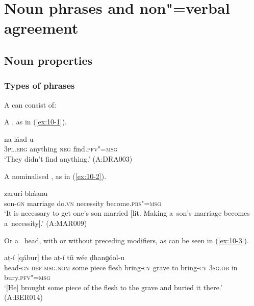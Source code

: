 \chapter{Noun phrases and non"=verbal agreement}
\label{chap:10}


\section{Noun  properties}
\label{sec:10-1}

\subsection{Types of  phrases}
\label{subsec:10-1-1}


A   can consist of: 


A , as in (\ref{ex:10-1}).

\begin{exe}
\ex
\label{ex:10-1}
\gll [taním] [ɡa] na láad-u  \\
\textsc{3pl.erg} anything \textsc{neg} find.\textsc{pfv"=msg} \\
\glt `They didn't find anything.' (A:DRA003)
\end{exe}

A nominalised , as in (\ref{ex:10-2}).

\begin{exe}
\ex
\label{ex:10-2}
 zarurí bháanu \\
son-\textsc{gn} marriage do.\textsc{vn} necessity become.\textsc{prs"=msg}  \\
\glt `It is necessary to get one's son married [lit. Making a~son's marriage becomes a~necessity].' (A:MAR009)
\end{exe}

Or a~ head, with or without preceding modifiers, as can be seen in (\ref{ex:10-3}).

\begin{exe}
\ex
\label{ex:10-3}
 aṭ-í [qábur] the aṭ-í tíi wée ḍhanɡóol-u \\
head-\textsc{gn} \textsc{def.msg.nom} some piece flesh bring-\textsc{cv} grave  to bring-\textsc{cv} \textsc{3sg.ob} in bury.\textsc{pfv"=msg}  \\
\glt `[He] brought some piece of the flesh to the grave and buried it there.' (A:BER014)
\end{exe}

